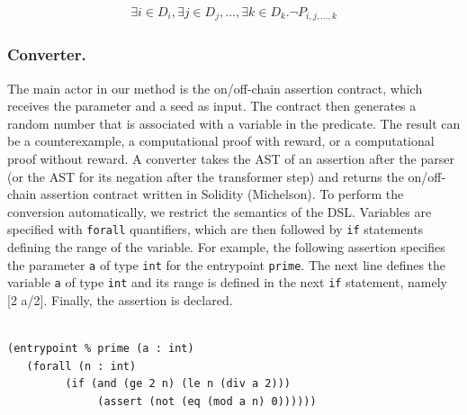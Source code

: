 \documentclass[runningheads]{llncs}
\begin{document}
\begin{gather}
  \label{eq:2}
\exists i \in D_{i},  \exists j \in D_{j},  ..., \exists k \in D_{k}. \neg P_{i, j, ...,k}
\end{gather}




\subsubsection{Converter.} The main actor in our method is the on/off-chain assertion contract, which receives the parameter and a seed as input. The contract then generates a random number that is associated with a variable in the predicate. The result can be a counterexample, a computational proof with reward, or a computational proof without reward. A converter takes the AST of an assertion after the parser (or the AST for its negation after the transformer step) and returns the on/off-chain assertion contract written in Solidity (Michelson). To perform the conversion automatically, we restrict the semantics of the DSL. Variables are specified with \texttt{forall} quantifiers, which are then followed by \texttt{if} statements defining the range of the variable. For example, the following assertion specifies the parameter \texttt{a} of type \texttt{int} for the entrypoint \texttt{prime}. The next line defines the variable \texttt{a} of type \texttt{int} and its range is defined in the next \texttt{if} statement, namely [2 a/2]. Finally, the assertion is declared.

\begin{lstlisting}[numbers=none]

(entrypoint % prime (a : int)
   (forall (n : int)
         (if (and (ge 2 n) (le n (div a 2)))
              (assert (not (eq (mod a n) 0))))))
             
\end{lstlisting}
\end{document}
